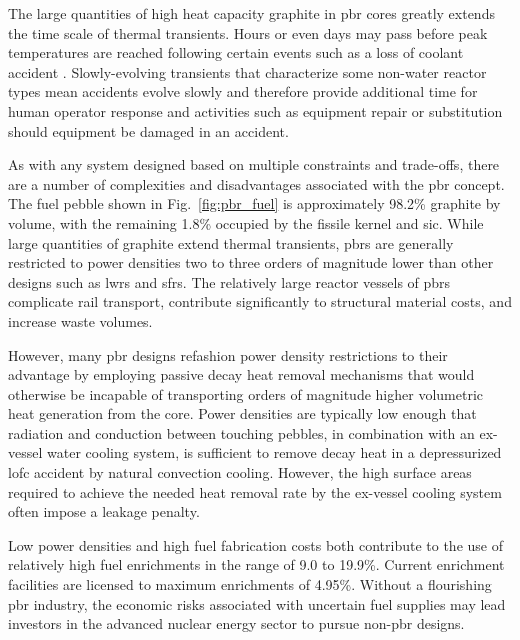 The large quantities of high heat capacity graphite in \gls{pbr} cores greatly extends the time scale of thermal transients. Hours or even days may pass before peak temperatures are reached following certain events such as a loss of coolant accident \cite{htrpm,tyobeka}. Slowly-evolving transients that characterize some non-water reactor types mean accidents evolve slowly and therefore provide additional time for human operator response and activities such as equipment repair or substitution should equipment be damaged in an accident.

As with any system designed based on multiple constraints and trade-offs, there are a number of complexities and disadvantages associated with the \gls{pbr} concept. The fuel pebble shown in Fig.\ \ref{fig:pbr_fuel} is approximately 98.2\% graphite by volume, with the remaining 1.8\% occupied by the fissile kernel and \gls{sic}. While large quantities of graphite extend thermal transients, \glspl{pbr} are generally restricted to power densities two to three orders of magnitude lower than other designs such as \glspl{lwr} and \glspl{sfr}. The relatively large reactor vessels of \glspl{pbr} complicate rail transport, contribute significantly to structural material costs, and increase waste volumes.

However, many \gls{pbr} designs refashion power density restrictions to their advantage by employing passive decay heat removal mechanisms that would otherwise be incapable of transporting orders of magnitude higher volumetric heat generation from the core. Power densities are typically low enough that radiation and conduction between touching pebbles, in combination with an ex-vessel water cooling system, is sufficient to remove decay heat in a depressurized \gls{lofc} accident by natural convection cooling. However, the high surface areas required to achieve the needed heat removal rate by the ex-vessel cooling system often impose a leakage penalty.

Low power densities and high fuel fabrication costs both contribute to the use of relatively high fuel enrichments in the range of 9.0 to 19.9\%. Current enrichment facilities are licensed to maximum enrichments of 4.95\%. Without a flourishing \gls{pbr} industry, the economic risks associated with uncertain fuel supplies may lead investors in the advanced nuclear energy sector to pursue non-\gls{pbr} designs. 

